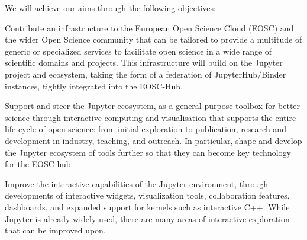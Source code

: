 

  

  
  

\noindent We will achieve our aims through the following objectives:

\begin{compactenum}

\item \label{obj:deployment} %
  Contribute an infrastructure to the European Open Science Cloud
  (EOSC) and the wider Open Science community that can be tailored to
  provide a multitude of generic or specialized services to facilitate
  open science in a wide range of scientific domains and projects.
  This infrastructure will build on the Jupyter project and ecosystem,
  taking the form of a federation of JupyterHub/Binder instances,
  tightly integrated into the EOSC-Hub.

\item \label{obj:jupyter} %
  Support and steer the Jupyter ecosystem, as a general purpose
  toolbox for better science through interactive computing and
  visualisation that supports the entire life-cycle of open science:
  from initial exploration to publication, research and development in
  industry, teaching, and outreach. In particular, shape and develop
  the Jupyter ecosystem of tools further so that they can become key
  technology for the EOSC-hub.

\item \label{obj:interactivity} %
  Improve the interactive capabilities of the Jupyter environment,
  through developments of interactive widgets,
  visualization tools, collaboration features, dashboards,
  and expanded support for kernels such as interactive C++.
  While Jupyter is already widely used, there are many areas
  of interactive exploration that can be improved upon.


\end{compactenum}

